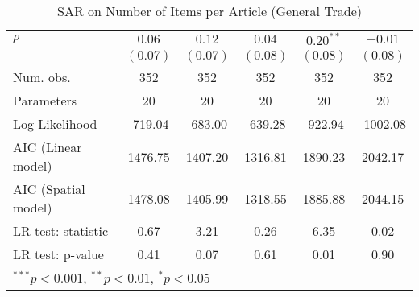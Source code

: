 \begin{table}[!h]
\begin{center}
\begin{tabular}{l c c c c c }
$\rho$                  & $0.06$       & $0.12$        & $0.04$       & $0.20^{**}$  & $-0.01$      \\
                        & $(0.07)$     & $(0.07)$      & $(0.08)$     & $(0.08)$     & $(0.08)$     \\
\midrule
Num. obs.               & 352          & 352           & 352          & 352          & 352          \\
Parameters              & 20           & 20            & 20           & 20           & 20           \\
Log Likelihood          & -719.04      & -683.00       & -639.28      & -922.94      & -1002.08     \\
AIC (Linear model)      & 1476.75      & 1407.20       & 1316.81      & 1890.23      & 2042.17      \\
AIC (Spatial model)     & 1478.08      & 1405.99       & 1318.55      & 1885.88      & 2044.15      \\
LR test: statistic      & 0.67         & 3.21          & 0.26         & 6.35         & 0.02         \\
LR test: p-value        & 0.41         & 0.07          & 0.61         & 0.01         & 0.90         \\
\bottomrule
\multicolumn{6}{l}{\scriptsize{$^{***}p<0.001$, $^{**}p<0.01$, $^*p<0.05$}}
\end{tabular}
\caption{SAR on Number of Items per Article (General Trade)}
\label{table:coefficients}
\end{center}
\end{table}
